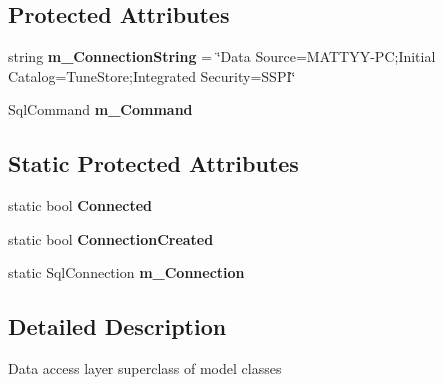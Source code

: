 \subsection*{Protected Attributes}
\begin{DoxyCompactItemize}
\item 
\hypertarget{class_tune_store_1_1_model_1_1_d_a_l_a4966b46d96f1ef56313015457f72e7ca}{string {\bfseries m\+\_\+\+Connection\+String} = \char`\"{}Data Source=M\+A\+T\+T\+Y\+Y-\/P\+C;Initial Catalog=Tune\+Store;Integrated Security=S\+S\+P\+I\char`\"{}}\label{class_tune_store_1_1_model_1_1_d_a_l_a4966b46d96f1ef56313015457f72e7ca}

\item 
\hypertarget{class_tune_store_1_1_model_1_1_d_a_l_aae6028ff60c0a0103a096e870ce097d0}{Sql\+Command {\bfseries m\+\_\+\+Command}}\label{class_tune_store_1_1_model_1_1_d_a_l_aae6028ff60c0a0103a096e870ce097d0}

\end{DoxyCompactItemize}
\subsection*{Static Protected Attributes}
\begin{DoxyCompactItemize}
\item 
\hypertarget{class_tune_store_1_1_model_1_1_d_a_l_a10ca522dc93f490d832ef98c7770ed7b}{static bool {\bfseries Connected}}\label{class_tune_store_1_1_model_1_1_d_a_l_a10ca522dc93f490d832ef98c7770ed7b}

\item 
\hypertarget{class_tune_store_1_1_model_1_1_d_a_l_a185064dd52f541717750cd3de77b0ddd}{static bool {\bfseries Connection\+Created}}\label{class_tune_store_1_1_model_1_1_d_a_l_a185064dd52f541717750cd3de77b0ddd}

\item 
\hypertarget{class_tune_store_1_1_model_1_1_d_a_l_af14bf3278fe3c80fa06b315ed5e93523}{static Sql\+Connection {\bfseries m\+\_\+\+Connection}}\label{class_tune_store_1_1_model_1_1_d_a_l_af14bf3278fe3c80fa06b315ed5e93523}

\end{DoxyCompactItemize}


\subsection{Detailed Description}
Data access layer superclass of model classes 



